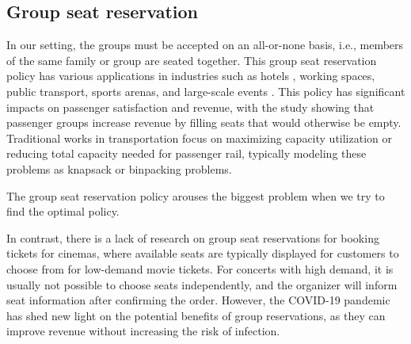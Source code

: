 


\subsection{Group seat reservation}
In our setting, the groups must be accepted on an all-or-none basis, i.e., members of the same family or group are seated together.  
This group seat reservation policy has various applications in industries such as hotels \cite{li2013modeling}, working spaces\cite{fischetti2021safe}, public transport\cite{deplano2019offline}, sports arenas\cite{kwag2022optimal}, and large-scale events \cite{lewis2016creating}. This policy has significant impacts on passenger satisfaction and revenue, with the study \cite{yuen2002group} showing that passenger groups increase revenue by filling seats that would otherwise be empty. Traditional works \cite{clausen2010off, deplano2019offline}in transportation focus on maximizing capacity utilization or reducing total capacity needed for passenger rail, typically modeling these problems as knapsack or binpacking problems.

The group seat reservation policy arouses the biggest problem when we try to find the optimal policy.

In contrast, there is a lack of research on group seat reservations for booking tickets for cinemas, where available seats are typically displayed for customers to choose from for low-demand movie tickets. For concerts with high demand, it is usually not possible to choose seats independently, and the organizer will inform seat information after confirming the order. However, the COVID-19 pandemic has shed new light on the potential benefits of group reservations, as they can improve revenue without increasing the risk of infection.


